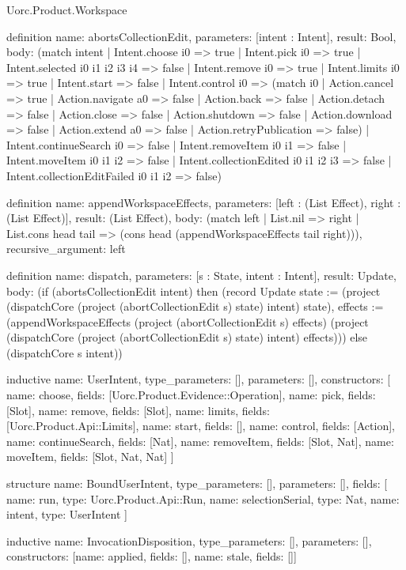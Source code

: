 \begin{lexlean}{Uorc.Product.Workspace}
\begin{semanticmodule}
definition{
  name: abortsCollectionEdit,
  parameters: [intent : Intent],
  result: Bool,
  body: (match intent
    | Intent.choose i0 => true
    | Intent.pick i0 => true
    | Intent.selected i0 i1 i2 i3 i4 => false
    | Intent.remove i0 => true
    | Intent.limits i0 => true
    | Intent.start => false
    | Intent.control i0 => (match i0
      | Action.cancel => true
      | Action.navigate a0 => false
      | Action.back => false
      | Action.detach => false
      | Action.close => false
      | Action.shutdown => false
      | Action.download => false
      | Action.extend a0 => false
      | Action.retryPublication => false)
    | Intent.continueSearch i0 => false
    | Intent.removeItem i0 i1 => false
    | Intent.moveItem i0 i1 i2 => false
    | Intent.collectionEdited i0 i1 i2 i3 => false
    | Intent.collectionEditFailed i0 i1 i2 => false)
}

definition{
  name: appendWorkspaceEffects,
  parameters: [left : (List Effect), right : (List Effect)],
  result: (List Effect),
  body: (match left
    | List.nil => right
    | List.cons head tail => (cons head (appendWorkspaceEffects tail right))),
  recursive_argument: left
}

definition{
  name: dispatch,
  parameters: [s : State, intent : Intent],
  result: Update,
  body: (if (abortsCollectionEdit intent) then (record Update {state := (project (dispatchCore (project (abortCollectionEdit s) state) intent) state), effects := (appendWorkspaceEffects (project (abortCollectionEdit s) effects) (project (dispatchCore (project (abortCollectionEdit s) state) intent) effects))}) else (dispatchCore s intent))
}

inductive{
  name: UserIntent,
  type_parameters: [],
  parameters: [],
  constructors: [
    {name: choose, fields: [Uorc.Product.Evidence::Operation]},
    {name: pick, fields: [Slot]},
    {name: remove, fields: [Slot]},
    {name: limits, fields: [Uorc.Product.Api::Limits]},
    {name: start, fields: []},
    {name: control, fields: [Action]},
    {name: continueSearch, fields: [Nat]},
    {name: removeItem, fields: [Slot, Nat]},
    {name: moveItem, fields: [Slot, Nat, Nat]}
  ]
}

structure{
  name: BoundUserIntent,
  type_parameters: [],
  parameters: [],
  fields: [
    {name: run, type: Uorc.Product.Api::Run},
    {name: selectionSerial, type: Nat},
    {name: intent, type: UserIntent}
  ]
}

inductive{
  name: InvocationDisposition,
  type_parameters: [],
  parameters: [],
  constructors: [{name: applied, fields: []}, {name: stale, fields: []}]
}


\end{semanticmodule}
\end{lexlean}
